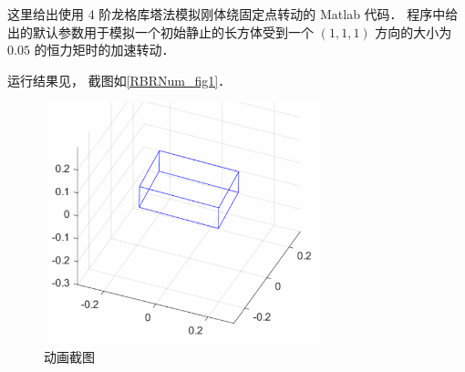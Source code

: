

这里给出使用 4 阶龙格库塔法模拟刚体绕固定点转动的 Matlab 代码． 程序中给出的默认参数用于模拟一个初始静止的长方体受到一个 $(1,1,1)$ 方向的大小为 $0.05$ 的恒力矩时的加速转动．

运行结果见， 截图如\autoref{RBRNum_fig1}．

\begin{figure}[ht]
\centering
\includegraphics[width=8cm]{./figures/RBRNum1.png}
\caption{动画截图} \label{RBRNum_fig1}
\end{figure}

